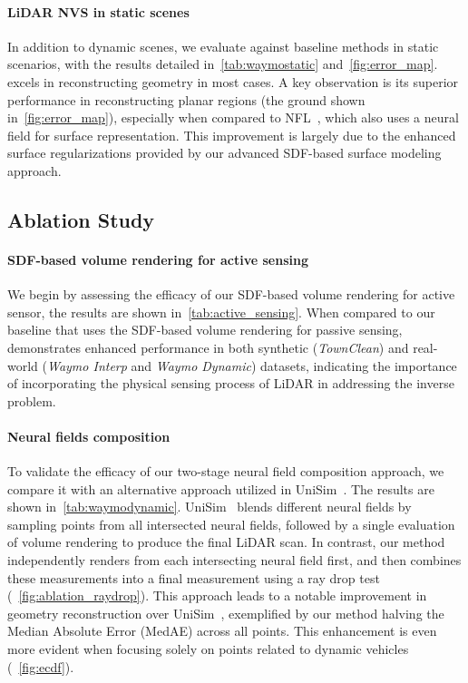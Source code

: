 
\paragraph{LiDAR NVS in static scenes}
In addition to dynamic scenes, we evaluate \dynfl against baseline methods in static scenarios, with the results detailed in~\cref{tab:waymostatic} and~\cref{fig:error_map}. \dynfl excels in reconstructing geometry in most cases. A key observation is its superior performance in reconstructing planar regions (\eg the ground shown in~\cref{fig:error_map}), especially when compared to NFL~\cite{Huang2023nfl}, which also uses a neural field for surface representation. This improvement is largely due to the enhanced surface regularizations provided by our advanced SDF-based surface modeling approach.













\subsection{Ablation Study}
\paragraph{SDF-based volume rendering for active sensing}
We begin by assessing the efficacy of our SDF-based volume rendering for active sensor, the results are shown in~\cref{tab:active_sensing}. When compared to our baseline that uses the SDF-based volume rendering for passive sensing, \dynfl demonstrates enhanced performance in both synthetic (\textit{TownClean}) and real-world (\textit{Waymo Interp} and \textit{Waymo Dynamic}) datasets, indicating the importance of incorporating the physical sensing process of LiDAR in addressing the inverse problem.


\paragraph{Neural fields composition} 
To validate the efficacy of our two-stage neural field composition approach, we compare it with an alternative approach utilized in UniSim~\cite{yang2023unisim}. The results are shown in~\cref{tab:waymodynamic}. UniSim~\cite{yang2023unisim} blends different neural fields by sampling points from all intersected neural fields, followed by a single evaluation of volume rendering to produce the final LiDAR scan. In contrast, our method independently renders from each intersecting neural field first, and then combines these measurements into a final measurement using a ray drop test (\cf~\cref{fig:ablation_raydrop}). This approach leads to a notable improvement in geometry reconstruction over UniSim~\cite{yang2023unisim}, exemplified by our method halving the Median Absolute Error (MedAE) across all points. This enhancement is even more evident when focusing solely on points related to dynamic vehicles (\cf~\cref{fig:ecdf}).
% 

